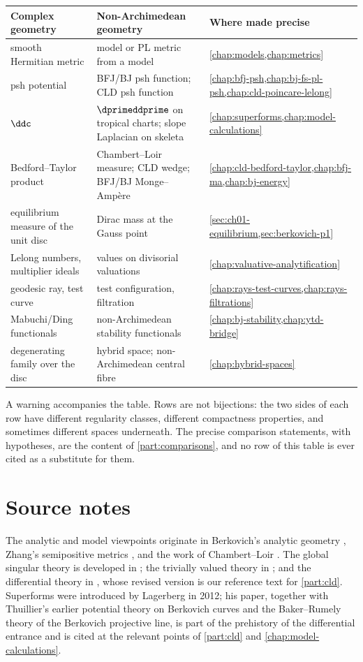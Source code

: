 \begin{center}
\small
\begin{tabular}{p{}|p{}|p{}}
\textbf{Complex geometry}&\textbf{Non-Archimedean geometry}
  &\textbf{Where made precise}\\ \hline
smooth Hermitian metric
  &model or PL metric from a model
  &\cref{chap:models,chap:metrics}\\
psh potential
  &BFJ/BJ psh function; CLD psh function
  &\cref{chap:bfj-psh,chap:bj-fs-pl-psh,chap:cld-poincare-lelong}\\
$\ddc$
  &$\dprimeddprime$ on tropical charts; slope Laplacian on skeleta
  &\cref{chap:superforms,chap:model-calculations}\\
Bedford--Taylor product
  &Chambert--Loir measure; CLD wedge; BFJ/BJ Monge--Amp\`ere
  &\cref{chap:cld-bedford-taylor,chap:bfj-ma,chap:bj-energy}\\
equilibrium measure of the unit disc
  &Dirac mass at the Gauss point
  &\cref{sec:ch01-equilibrium,sec:berkovich-p1}\\
Lelong numbers, multiplier ideals
  &values on divisorial valuations
  &\cref{chap:valuative-analytification}\\
geodesic ray, test curve
  &test configuration, filtration
  &\cref{chap:rays-test-curves,chap:rays-filtrations}\\
Mabuchi/Ding functionals
  &non-Archimedean stability functionals
  &\cref{chap:bj-stability,chap:ytd-bridge}\\
degenerating family over the disc
  &hybrid space; non-Archimedean central fibre
  &\cref{chap:hybrid-spaces}
\end{tabular}
\end{center}

A warning accompanies the table.  Rows are not bijections: the two sides of
each row have different regularity classes, different compactness
properties, and sometimes different spaces underneath.  The precise
comparison statements, with hypotheses, are the content of
\cref{part:comparisons}, and no row of this table is ever cited as a
substitute for them.

\section*{Source notes}
\label{sec:ch01-source-notes}

The analytic and model viewpoints originate in Berkovich's analytic geometry
\cite{Berk12}, Zhang's semipositive metrics \cite{Zhang1995}, and the
work of Chambert--Loir \cite{CL06}. The global singular theory is
developed in \cite{BFJ16,BFJ15,BFJ16b}; the trivially valued theory in
\cite{BJ22}; and the differential theory in
\cite{CLD12}, whose revised version \cite{CLD25} is our reference text for
\cref{part:cld}.  Superforms were introduced by Lagerberg in 2012; his
paper, together with Thuillier's earlier potential theory on Berkovich
curves and the Baker--Rumely theory of the Berkovich projective line, is
part of the prehistory of the differential entrance and is cited at the
relevant points of \cref{part:cld} and \cref{chap:model-calculations}.

